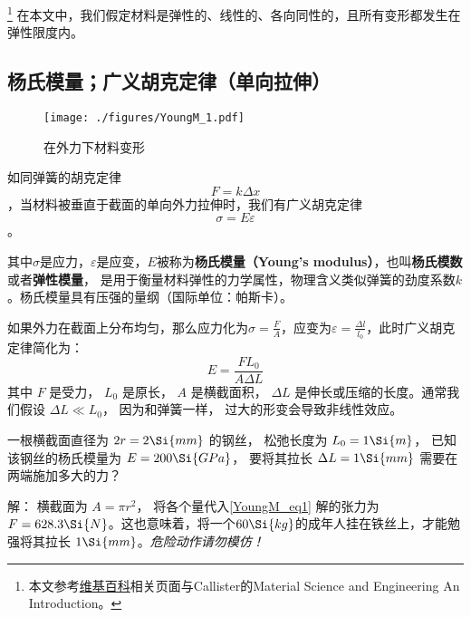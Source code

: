 
\begin{issues}
\issueDraft
\end{issues}

\footnote{本文参考\href{https://en.wikipedia.org/wiki/Young's_modulus}{维基百科}相关页面与Callister的Material Science and Engineering An Introduction。}
在本文中，我们假定材料是弹性的、线性的、各向同性的，且所有变形都发生在弹性限度内。

\subsection{杨氏模量；广义胡克定律（单向拉伸）}
\begin{figure}[ht]
\centering
\texttt{[image: ./figures/YoungM\_1.pdf]}
\caption{在外力下材料变形} \label{YoungM_fig1}
\end{figure}

如同弹簧的胡克定律$$F=k \Delta x$$，当材料被垂直于截面的单向外力拉伸时，我们有广义胡克定律
\begin{equation}
\sigma = E \varepsilon
\end{equation}。

其中$\sigma$是应力，$\varepsilon$是应变，$E$被称为\textbf{杨氏模量（Young's modulus）}，也叫\textbf{杨氏模数}或者\textbf{弹性模量}， 是用于衡量材料弹性的力学属性，物理含义类似弹簧的劲度系数$k$。杨氏模量具有压强的量纲（国际单位：帕斯卡）。

如果外力在截面上分布均匀，那么应力化为$\sigma=\frac{F}{A}$，应变为$\varepsilon=\frac{\Delta l}{l_0}$，此时广义胡克定律简化为：
\begin{equation}\label{YoungM_eq1}
E = \frac{FL_0}{A\Delta L}
\end{equation}
其中 $F$ 是受力， $L_0$ 是原长， $A$ 是横截面积， $\Delta L$ 是伸长或压缩的长度。通常我们假设 $\Delta L \ll L_0$， 因为和弹簧一样， 过大的形变会导致非线性效应。

\begin{example}{}
一根横截面直径为 $2r = 2\Si{mm}$ 的钢丝， 松弛长度为 $L_0 = 1\Si{m}$， 已知该钢丝的杨氏模量为 $E = 200\Si{GPa}$， 要将其拉长 $\Delta L = 1\Si{mm}$ 需要在两端施加多大的力？

解： 横截面为 $A = \pi r^2$， 将各个量代入\autoref{YoungM_eq1} 解的张力为 $F = 628.3\Si{N}$。这也意味着，将一个$60 \Si{kg}$的成年人挂在铁丝上，才能勉强将其拉长 $1\Si{mm}$。\textsl{危险动作请勿模仿！}
\end{example}

